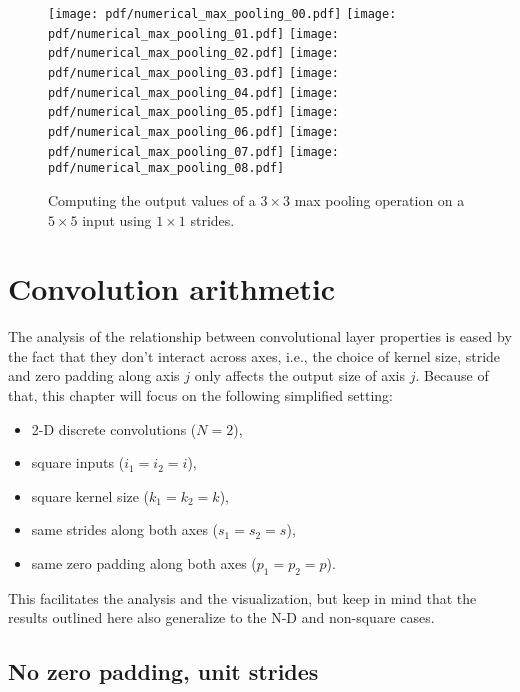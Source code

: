 \documentclass[notitlepage]{report}
\begin{document}
\begin{figure}[p]
    \centering
    \texttt{[image: pdf/numerical\_max\_pooling\_00.pdf]}
    \texttt{[image: pdf/numerical\_max\_pooling\_01.pdf]}
    \texttt{[image: pdf/numerical\_max\_pooling\_02.pdf]}
    \texttt{[image: pdf/numerical\_max\_pooling\_03.pdf]}
    \texttt{[image: pdf/numerical\_max\_pooling\_04.pdf]}
    \texttt{[image: pdf/numerical\_max\_pooling\_05.pdf]}
    \texttt{[image: pdf/numerical\_max\_pooling\_06.pdf]}
    \texttt{[image: pdf/numerical\_max\_pooling\_07.pdf]}
    \texttt{[image: pdf/numerical\_max\_pooling\_08.pdf]}
    \caption{\label{fig:numerical_max_pooling} Computing the output values of a
        $3 \times 3$ max pooling operation on a $5 \times 5$ input using $1
        \times 1$ strides.}
\end{figure}

\chapter{Convolution arithmetic}

The analysis of the relationship between convolutional layer properties is eased
by the fact that they don't interact across axes, i.e., the choice of kernel
size, stride and zero padding along axis $j$ only affects the output size of
axis $j$. Because of that, this chapter will focus on the following simplified
setting:

\begin{itemize}
    \item 2-D discrete convolutions ($N = 2$),
    \item square inputs ($i_1 = i_2 = i$),
    \item square kernel size ($k_1 = k_2 = k$),
    \item same strides along both axes ($s_1 = s_2 = s$),
    \item same zero padding along both axes ($p_1 = p_2 = p$).
\end{itemize}

This facilitates the analysis and the visualization, but keep in mind that the
results outlined here also generalize to the N-D and non-square cases.

\section{No zero padding, unit strides}
\end{document}
